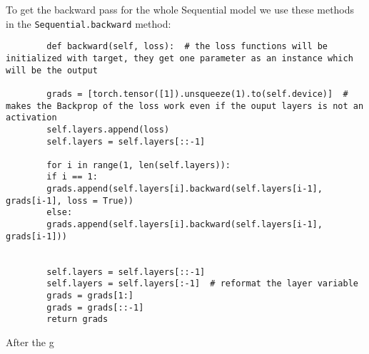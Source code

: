 \documentclass[11pt,english]{article}
\begin{document}
	To get the backward pass for the whole Sequential model we use these methods in the \lstinline|Sequential.backward| method:
	
	\begin{lstlisting}
		def backward(self, loss):  # the loss functions will be initialized with target, they get one parameter as an instance which will be the output
		
		grads = [torch.tensor([1]).unsqueeze(1).to(self.device)]  # makes the Backprop of the loss work even if the ouput layers is not an activation
		self.layers.append(loss)
		self.layers = self.layers[::-1]
		
		for i in range(1, len(self.layers)):
		if i == 1:
		grads.append(self.layers[i].backward(self.layers[i-1], grads[i-1], loss = True))
		else:
		grads.append(self.layers[i].backward(self.layers[i-1], grads[i-1]))
		
		
		self.layers = self.layers[::-1]
		self.layers = self.layers[:-1]  # reformat the layer variable
		grads = grads[1:]
		grads = grads[::-1]
		return grads
	\end{lstlisting}
	
	After the g
	\printbibliography
\end{document}
